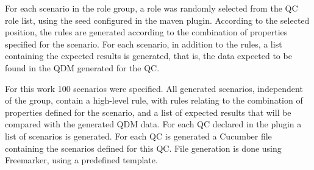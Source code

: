 \documentclass[AMA,STIX1COL,hidelinks]{WileyNJD-v2}
\begin{document}

For each scenario in the role group, a role was randomly selected from the QC role list, using the seed configured in the maven plugin. According to the selected position, the rules are generated according to the combination of properties specified for the scenario. For each scenario, in addition to the rules, a list containing the expected results is generated, that is, the data expected to be found in the QDM generated for the QC.


For this work 100 scenarios were specified. All generated scenarios, independent of the group, contain a high-level rule, with rules relating to the combination of properties defined for the scenario, and a list of expected results that will be compared with the generated QDM data. For each QC declared in the plugin a list of scenarios is generated. For each QC is generated a Cucumber file containing the scenarios defined for this QC. File generation is done using Freemarker, using a predefined template.

\end{document}

